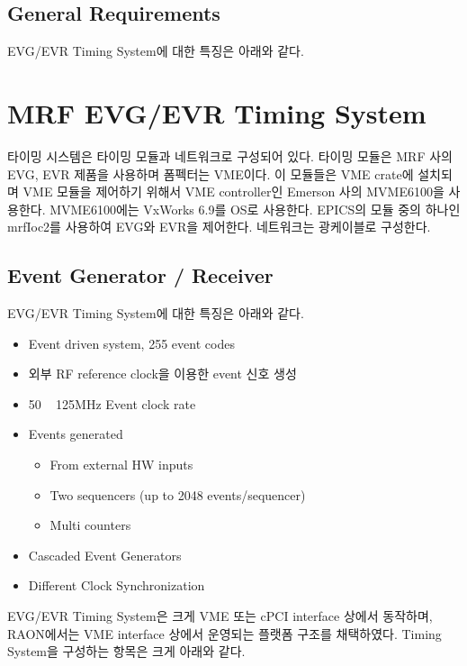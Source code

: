 \documentclass[11pt
  , a4paper
  , article
  , oneside
]{memoir}
\begin{document}
\section{General Requirements}
EVG/EVR Timing System에 대한 특징은 아래와 같다.



\chapter{MRF EVG/EVR Timing System}
타이밍 시스템은 타이밍 모듈과 네트워크로 구성되어 있다. 타이밍 모듈은 MRF 사의 EVG, EVR 제품을 사용하며 폼펙터는 VME이다. 이 모듈들은 VME crate에 설치되며 VME 모듈을 제어하기 위해서 VME controller인 Emerson 사의 MVME6100을 사용한다. MVME6100에는 VxWorks 6.9를 OS로 사용한다. EPICS의 모듈 중의 하나인 mrfIoc2를 사용하여 EVG와 EVR을 제어한다. 네트워크는 광케이블로 구성한다. 
\section{Event Generator / Receiver}
EVG/EVR Timing System에 대한 특징은 아래와 같다.

\begin{itemize}
	\item Event driven system, 255 event codes
	\item 외부 RF reference clock을 이용한 event 신호 생성
	\item 50 ~ 125MHz Event clock rate
	\item Events generated
	\begin{itemize}
		\item From external HW inputs
		\item Two sequencers (up to 2048 events/sequencer)
		\item Multi counters
	\end{itemize}
	\item Cascaded Event Generators
	\item Different Clock Synchronization
\end{itemize}
EVG/EVR Timing System은 크게 VME 또는 cPCI interface 상에서 동작하며, RAON에서는 VME interface 상에서 운영되는 플랫폼 구조를 채택하였다. Timing System을 구성하는 항목은 크게 아래와 같다.





\clearpage


\end{document}
